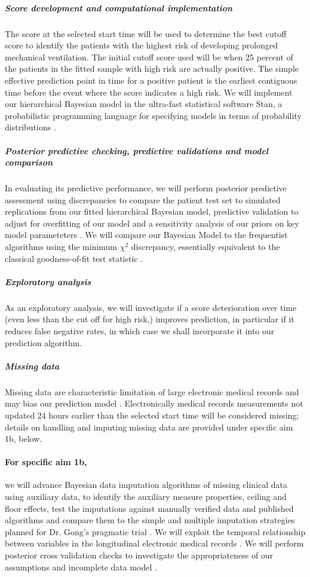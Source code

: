 \documentclass[11pt,notitlepage]{article}
\begin{document}
\subparagraph*{Score development and computational implementation}
The score at the selected start time will be used to determine the best cutoff score to identify the patients with the highest risk of developing prolonged mechanical ventilation. The initial cutoff score used will be when 25 percent of the patients in the fitted sample with high risk are actually positive. The simple effective prediction point in time for a positive patient is the earliest contiguous time before the event where the score indicates a high risk. We will implement our hierarchical Bayesian model in the ultra-fast statistical software Stan, a probabilistic programming language for specifying models in terms of probability distributions \cite{Stan_Software_2014}. 

\subparagraph*{Posterior predictive checking, predictive validations and model comparison}
In evaluating its predictive performance, we will perform posterior predictive assessment using discrepancies \cite{GelmanMengStern1996} to compare the patient test set to simulated replications from our fitted hierarchical Bayesian model, predictive validation to adjust for overfitting of our model and a sensitivity analysis of our priors on key model parameteters \cite{Gelman-Hill_2014,Gelman_predictive_2000}. We will compare our Bayesian Model to the frequentist algorithms using the minimum $\chi^{2}$ discrepancy, essentially equivalent to the classical
goodness-of-fit test statistic \cite{GelmanMengStern1996}.

\subparagraph{Exploratory analysis}
As an exploratory analysis, we will investigate if a score deterioration over time (even less than the cut off for high risk,) improves prediction, in particular if it reduces false negative rates, in which case we shall incorporate it into our prediction algorithm.

\subparagraph*{Missing data}
Missing data are characteristic limitation of large electronic medical records and may bias our prediction model \cite{Dean_19279318}. Electronically medical records measurements not updated 24 hours earlier than the selected start time will be considered missing; details on handling and imputing missing data are provided under specific aim 1b, below. 

\paragraph*{For specific aim 1b,}
we will advance Bayesian data imputation algorithms of missing clinical data using auxiliary data, to identify the auxiliary measure properties, ceiling and floor effects, test the imputations against manually verified data and published algorithms and compare them to the simple and multiple imputation strategies planned for Dr. Gong's pragmatic trial \cite{Huntington_16311133,Sloan_15027501}. We will exploit the temporal relationship between variables in the longitudinal electronic medical records \cite{Welch24782349}. We will perform posterior cross validation checks to investigate the appropriateness of our assumptions and incomplete data model \cite{Gelman1998notasked}.
\end{document}
